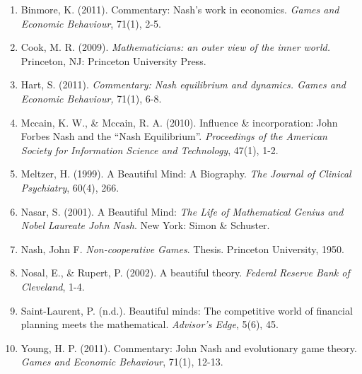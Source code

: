 \documentclass[11pt]{article}
\begin{document}

\begin{enumerate}
\item Binmore, K. (2011). Commentary: Nash's work in economics. \textit{Games and Economic Behaviour}, 71(1), 2-5.
\item Cook, M. R. (2009). \textit{Mathematicians: an outer view of the inner world.} Princeton, NJ: Princeton University Press.
\item Hart, S. (2011). \textit{Commentary: Nash equilibrium and dynamics. Games and Economic Behaviour,} 71(1), 6-8.
\item Mccain, K. W., \& Mccain, R. A. (2010). Influence \& incorporation: John Forbes Nash and the “Nash Equilibrium”. \textit{Proceedings of the American Society for Information Science and Technology}, 47(1), 1-2.
\item Meltzer, H. (1999). A Beautiful Mind: A Biography. \textit{The Journal of Clinical Psychiatry}, 60(4), 266.
\item Nasar, S. (2001). A Beautiful Mind: \textit{The Life of Mathematical Genius and Nobel Laureate John Nash}. New York: Simon \& Schuster.
\item Nash, John F. \textit{Non-cooperative Games}. Thesis. Princeton University, 1950.
\item Nosal, E., \& Rupert, P. (2002). A beautiful theory. \textit{Federal Reserve Bank of Cleveland}, 1-4.
\item Saint-Laurent, P. (n.d.). Beautiful minds: The competitive world of financial planning meets the mathematical.\textit{ Advisor's Edge}, 5(6), 45.
\item Young, H. P. (2011). Commentary: John Nash and evolutionary game theory. \textit{Games and Economic Behaviour}, 71(1), 12-13.
\end{enumerate}
\end{document}
